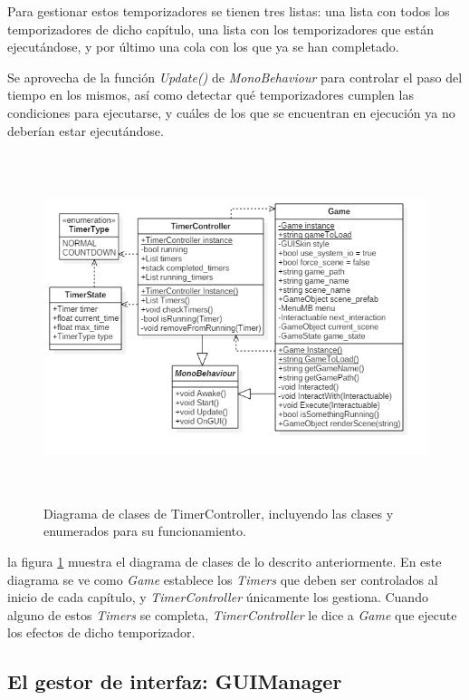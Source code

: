 Para gestionar estos temporizadores se tienen tres listas:  una lista con todos los temporizadores de dicho capítulo, una lista con los temporizadores que están ejecutándose, y por último una cola con los que ya se han completado.

Se aprovecha de la función \textit{Update()} de \textit{MonoBehaviour} para controlar el paso del tiempo en los mismos, así como detectar qué temporizadores cumplen las condiciones para ejecutarse, y cuáles de los que se encuentran en ejecución ya no deberían estar ejecutándose.

\begin{figure}[h!]
	\centerline{\includegraphics[height=4in]{figures/it2/TimerController.png}}
	\caption[TimerController - Versión Final]{Diagrama de clases de TimerController, incluyendo las clases y enumerados para su funcionamiento.}
	\label{timercontrollerit2}
\end{figure}

la figura \ref{timercontrollerit2} muestra el diagrama de clases de lo descrito anteriormente. En este diagrama se ve como \textit{Game} establece los \textit{Timers} que deben ser controlados al inicio de cada capítulo, y \textit{TimerController} únicamente los gestiona. Cuando alguno de estos \textit{Timers} se completa, \textit{TimerController} le dice a \textit{Game} que ejecute los efectos de dicho temporizador.

\newpage

\subsection{El gestor de interfaz: GUIManager}
\label{guimanagersectionit2}

